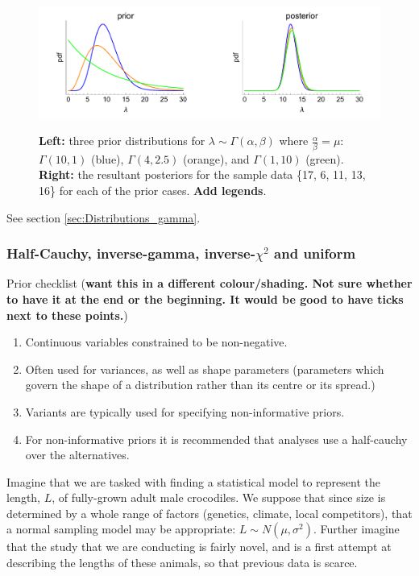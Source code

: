 \documentclass[11pt,fullpage]{book}
\begin{document}
\begin{figure}
\centering
\scalebox{0.5} 
{\includegraphics{Distributions_gammaPrior.pdf}}
\caption{\textbf{Left:} three prior distributions for $\lambda\sim \Gamma(\alpha,\beta)$ where $\frac{\alpha}{\beta}=\mu$: $\Gamma(10,1)$ (blue), $\Gamma(4,2.5)$ (orange), and $\Gamma(1,10)$ (green). \textbf{Right:} the resultant posteriors for the sample data \{17, 6, 11, 13, 16\} for each of the prior cases. \textbf{Add legends}.}\label{fig:Distributions_gammaPrior}
\end{figure}

See section \ref{sec:Distributions_gamma}.


\subsubsection{Half-Cauchy, inverse-gamma, inverse-$\chi^2$ and uniform}
Prior checklist (\textbf{want this in a different colour/shading. Not sure whether to have it at the end or the beginning. It would be good to have ticks next to these points.})

\begin{enumerate} 
\item Continuous variables constrained to be non-negative.
\item Often used for variances, as well as shape parameters (parameters which govern the shape of a distribution rather than its centre or its spread.)
\item Variants are typically used for specifying non-informative priors.
\item For non-informative priors it is recommended that analyses use a half-cauchy over the alternatives.
\end{enumerate}

Imagine that we are tasked with finding a statistical model to represent the length, $L$, of fully-grown adult male crocodiles. We suppose that since size is determined by a whole range of factors (genetics, climate, local competitors), that a normal sampling model may be appropriate: $L\sim N(\mu,\sigma^2)$. Further imagine that the study that we are conducting is fairly novel, and is a first attempt at describing the lengths of these animals, so that previous data is scarce.
\end{document}
